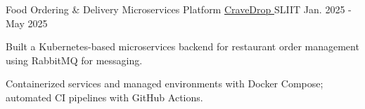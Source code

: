 
\begin{cventries}

  \cventry
    {Food Ordering & Delivery Microservices Platform}
    {\href{https://github.com/nmdra/CraveDrop}{CraveDrop \faGithub}}
    {SLIIT}
    {Jan. 2025 - May 2025}
    {
      \begin{cvitems}
        \item {Built a Kubernetes-based microservices backend for restaurant order management using RabbitMQ for messaging.}
        \item {Containerized services and managed environments with Docker Compose; automated CI pipelines with GitHub Actions.}
      \end{cvitems}
    }





\end{cventries}
